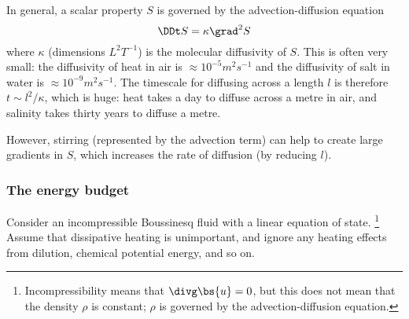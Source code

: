 In general, a scalar property $S$ is governed by the advection-diffusion equation
\begin{equation}
    \DDt S = \kappa\grad^2S
\end{equation}
where $\kappa$ (dimensions $L^2T^{-1}$) is the molecular diffusivity of $S$. This is often very small: the diffusivity of heat in air is $\approx10^{-5}m^2s^{-1}$ and the diffusivity of salt in water is $\approx10^{-9}m^2s^{-1}$. The timescale for diffusing across a length $l$ is therefore $t\sim l^2/\kappa$, which is huge: heat takes a day to diffuse across a metre in air, and salinity takes thirty years to diffuse a metre.

However, stirring (represented by the advection term) can help to create large gradients in $S$, which increases the rate of diffusion (by reducing $l$).

\subsubsection{The energy budget}

Consider an incompressible Boussinesq fluid with a linear equation of state.
\footnote{Incompressibility means that $\divg\bs{u}=0$, but this does not mean that the density $\rho$ is constant; $\rho$ is governed by the advection-diffusion equation.}
Assume that dissipative heating is unimportant, and ignore any heating effects from dilution, chemical potential energy, and so on. 

